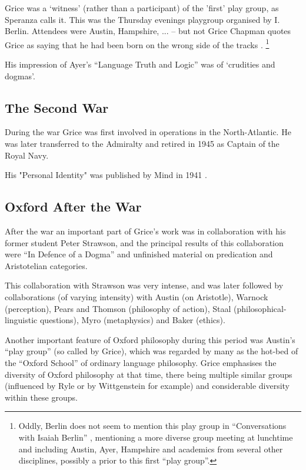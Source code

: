 \documentclass[10pt,titlepage]{book}
\begin{document}
Grice was a `witness' (rather than a participant) of the 'first' play group, as Speranza calls it.
This  was the Thursday evenings playgroup organised by I. Berlin.
Attendees were Austin, Hampshire, ... -- but not Grice
Chapman quotes Grice as saying that he had been born on the wrong side of the tracks \cite{chapman2006}.
\footnote{Oddly, Berlin does not seem to mention this play group in ``Conversations with Isaiah Berlin'' \cite{berlin91}, mentioning a more diverse group meeting at lunchtime and including Austin, Ayer, Hampshire and academics from several other disciplines, possibly a prior to this first ``play group''.}

His impression of Ayer's ``Language Truth and Logic'' \cite{ayer1936} was of `crudities and dogmas'.

\subsection{The Second War}

During the war Grice was first involved in operations in the North-Atlantic.
He was later transferred to the Admiralty and retired in 1945 as Captain of the Royal  
Navy.

His "Personal Identity" was published by Mind in 1941 \cite{grice41}. 

\subsection{Oxford After the War}

After the war an important part of Grice's work was in collaboration with his former student Peter Strawson, and the principal results of this collaboration were ``In Defence of a Dogma'' \cite{grice56} and unfinished material on predication and Aristotelian categories.

This collaboration with Strawson was very intense, and was later followed by collaborations (of varying intensity) with Austin (on Aristotle), Warnock (perception), Pears and Thomson (philosophy of action), Staal (philosophical-linguistic questions), Myro (metaphysics) and Baker (ethics).

Another important feature of Oxford philosophy during this period was Austin's ``play group'' (so called by Grice), which was regarded by many as the hot-bed of the ``Oxford School'' of ordinary language philosophy.
Grice emphasises the diversity of Oxford philosophy at that time, there being multiple similar groups (influenced by Ryle or by Wittgenstein for example) and considerable diversity within these groups.  
\end{document}
